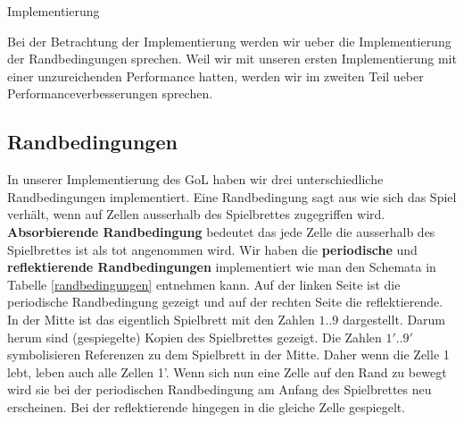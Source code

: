 \documentclass[runningheads]{llncs}
\begin{document}
\begin{section}{Implementierung}
    
    Bei der Betrachtung der Implementierung werden wir ueber die Implementierung der Randbedingungen sprechen.
    Weil wir mit unseren ersten Implementierung mit einer unzureichenden Performance hatten,
    werden wir im zweiten Teil ueber Performanceverbesserungen sprechen.
   
    

    \subsection{Randbedingungen}
        In unserer Implementierung des GoL haben wir drei unterschiedliche Randbedingungen implementiert.
        Eine Randbedingung sagt aus wie sich das Spiel verhält, wenn auf Zellen ausserhalb des Spielbrettes zugegriffen wird. \newline
        \textbf{Absorbierende Randbedingung} bedeutet das jede Zelle die ausserhalb des Spielbrettes ist als tot angenommen wird.\newline
        Wir haben die \textbf{periodische} und \textbf{reflektierende Randbedingungen} implementiert wie man den Schemata in Tabelle \ref{randbedingungen} entnehmen kann.
        Auf der linken Seite ist die periodische Randbedingung gezeigt und auf der rechten Seite die reflektierende.
        In der Mitte ist das eigentlich Spielbrett mit den Zahlen $1..9$ dargestellt.
        Darum herum sind (gespiegelte) Kopien des Spielbrettes gezeigt.
        Die Zahlen $1'..9'$ symbolisieren Referenzen zu dem Spielbrett in der Mitte.
        Daher wenn die Zelle 1 lebt, leben auch alle Zellen 1'.
        Wenn sich nun eine Zelle auf den Rand zu bewegt wird sie bei der periodischen Randbedingung am Anfang des Spielbrettes neu erscheinen.
        Bei der reflektierende hingegen in die gleiche Zelle gespiegelt.



\end{section}
\end{document}
